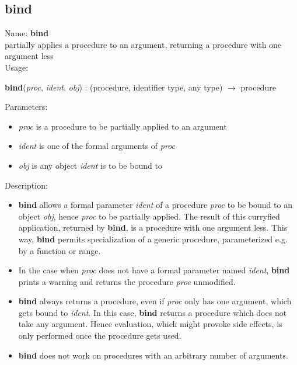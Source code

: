 \subsection{bind}
\label{labbind}
\noindent Name: \textbf{bind}\\
\phantom{aaa}partially applies a procedure to an argument, returning a procedure with one argument less\\[0.2cm]
\noindent Usage: 
\begin{center}
\textbf{bind}(\emph{proc}, \emph{ident}, \emph{obj}) : (\textsf{procedure}, \textsf{identifier type}, \textsf{any type}) $\rightarrow$ \textsf{procedure}\\
\end{center}
Parameters: 
\begin{itemize}
\item \emph{proc} is a procedure to be partially applied to an argument
\item \emph{ident} is one of the formal arguments of \emph{proc}
\item \emph{obj} is any \sollya object \emph{ident} is to be bound to
\end{itemize}
\noindent Description: \begin{itemize}

\item \textbf{bind} allows a formal parameter \emph{ident} of a procedure \emph{proc} to 
   be bound to an object \emph{obj}, hence \emph{proc} to be partially applied.
   The result of this curryfied application, returned by \textbf{bind}, is 
   a procedure with one argument less. This way, \textbf{bind} permits 
   specialization of a generic procedure, parameterized e.g. by a function
   or range.

\item In the case when \emph{proc} does not have a formal parameter named 
   \emph{ident}, \textbf{bind} prints a warning and returns the procedure 
   \emph{proc} unmodified. 

\item \textbf{bind} always returns a procedure, even if \emph{proc} only has one 
   argument, which gets bound to \emph{ident}. In this case, \textbf{bind}
   returns a procedure which does not take any argument. Hence 
   evaluation, which might provoke side effects, is only performed
   once the procedure gets used.

\item \textbf{bind} does not work on procedures with an arbitrary number
   of arguments.
\end{itemize}
